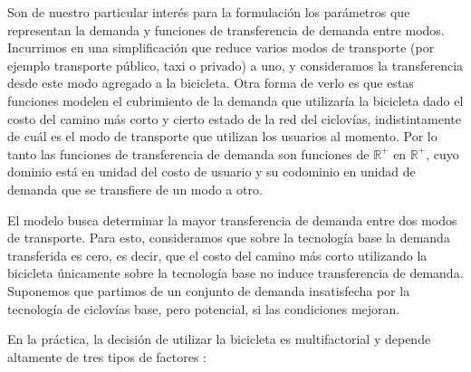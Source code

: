 \documentclass{article}
\begin{document}

  Son de nuestro particular interés para la formulación los parámetros que representan la demanda y funciones de transferencia de demanda entre modos. Incurrimos en una simplificación que reduce varios modos de transporte (por ejemplo transporte público, taxi o privado) a uno, y consideramos la transferencia desde este modo agregado a la bicicleta. Otra forma de verlo es que estas funciones modelen el cubrimiento de la demanda que utilizaría la bicicleta dado el costo del camino más corto y cierto estado de la red del ciclovías, indistintamente de cuál es el modo de transporte que utilizan los usuarios al momento. Por lo tanto las funciones de transferencia de demanda son funciones de $\mathbb{R}^+$ en $\mathbb{R}^+$, cuyo dominio está en unidad del costo de usuario y su codominio en unidad de demanda que se transfiere de un modo a otro.

  El modelo busca determinar la mayor transferencia de demanda entre dos modos de transporte. Para esto, consideramos que sobre la tecnología base la demanda transferida es cero, es decir, que el costo del camino más corto utilizando la bicicleta únicamente sobre la tecnología base no induce transferencia de demanda. Suponemos que partimos de un conjunto de demanda insatisfecha por la tecnología de ciclovías base, pero potencial, si las condiciones mejoran.

  En la práctica, la decisión de utilizar la bicicleta es multifactorial y depende altamente de tres tipos de factores \cite{ortuz2011}:
\end{document}
